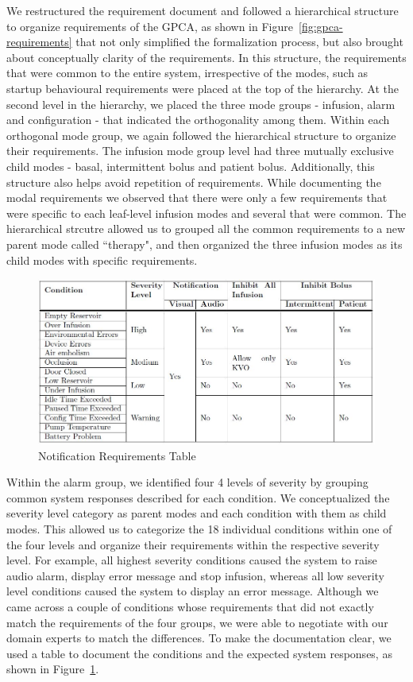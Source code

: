We restructured the requirement document and followed a hierarchical structure to organize requirements of the GPCA, as shown in Figure~\ref{fig:gpca-requirements} that not only simplified the formalization process, but also brought about conceptually clarity of the requirements. In this structure, the requirements that were common to the entire system, irrespective of the modes, such as startup behavioural requirements were placed at the top of the hierarchy. At the second level in the hierarchy, we placed the three mode groups - infusion, alarm and configuration - that indicated the orthogonality among them. Within each orthogonal mode group, we again followed the hierarchical structure to organize their requirements. The infusion mode group level had three mutually exclusive child modes - basal, intermittent bolus and patient bolus. Additionally, this structure also helps avoid repetition of requirements. While documenting the modal requirements we observed that there were only a few requirements that were specific to each leaf-level infusion modes and several that were common. The hierarchical strcutre allowed us to grouped all the common requirements to a new parent mode called ``therapy", and then organized the three infusion modes as its child modes with specific requirements. 

 \begin{figure}[h!]
    \centering
    \includegraphics[width=\columnwidth]{images/alarm.jpg}
    \caption{Notification Requirements Table}
    \label{fig:gpca-alarm}
 \end{figure}

Within the alarm group, we identified four 4 levels of severity by grouping common system responses described for each condition. We conceptualized the severity level category as parent modes and each condition with them as child modes. This allowed us to categorize the 18 individual conditions within one of the four levels and organize their requirements within the respective severity level. For example, all highest severity conditions caused the system to raise audio alarm, display error message and stop infusion, whereas all low severity level conditions caused the system to display an error message. Although we came across a couple of conditions whose requirements that did not exactly match the requirements of the four groups, we were able to negotiate with our domain experts to match the differences. To make the documentation clear, we used a table to document the conditions and the expected system responses, as shown in Figure~\ref{fig:gpca-alarm}.

